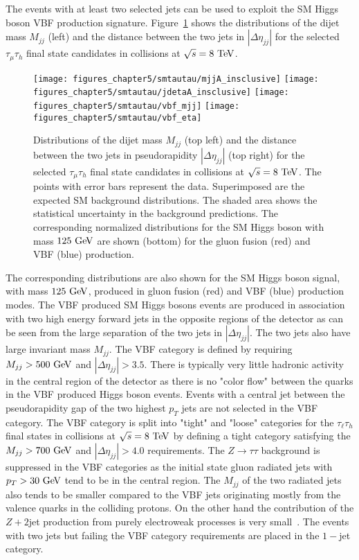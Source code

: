 The events with at least two selected jets can be used to exploit the SM Higgs boson VBF production signature. Figure~\ref{fig:vbfjet} shows the distributions of the dijet mass $M_{jj}$ (left) and the distance between the two jets in $|\Delta \eta_{jj}|$ for the selected $\tau_{\mu}\tau_{h}$ final state candidates in collisions at $\sqrt{s}=8~\mathrm{Te\kern -0.1em V}$. 
\begin{figure}[htbp]
\centering
\texttt{[image: figures\_chapter5/smtautau/mjjA\_insclusive]}
\texttt{[image: figures\_chapter5/smtautau/jdetaA\_insclusive]}
\texttt{[image: figures\_chapter5/smtautau/vbf\_mjj]}
\texttt{[image: figures\_chapter5/smtautau/vbf\_eta]}
\caption{Distributions of the dijet mass $M_{jj}$ (top left) and the distance between the two jets in pseudorapidity $|\Delta \eta_{jj}|$ (top right) for the selected $\tau_{\mu}\tau_{h}$ final state candidates in collisions at $\sqrt{s}=8~\mathrm{Te\kern -0.1em V}$. The points with error bars represent the data. Superimposed are the expected SM background distributions. The shaded area shows the statistical uncertainty in the background predictions. The corresponding normalized distributions for the SM Higgs boson with mass $125~\mathrm{Ge\kern -0.1em V}$ are shown (bottom) for the gluon fusion (red) and VBF (blue) production.}
\label{fig:vbfjet}
\end{figure}
The corresponding distributions are also shown for the SM Higgs boson signal, with mass $125~\mathrm{Ge\kern -0.1em V}$, produced in gluon fusion (red) and VBF (blue) production modes. The VBF produced SM Higgs bosons events are produced in association with two high energy forward jets in the opposite regions of the detector as can be seen from the large separation of the two jets in $|\Delta \eta_{jj}|$. The two jets also have large invariant mass $M_{jj}$.  The VBF category is defined by requiring $M_{jj}>500~\mathrm{Ge\kern -0.1em V}$ and  $|\Delta \eta_{jj}|>3.5$. There is typically very little hadronic activity in the central region of the detector as there is no "color flow" between the quarks in the VBF produced Higgs boson events. Events with a central jet between the pseudorapidity gap of the two highest $p_{T}$ jets are not selected in the VBF category. The VBF category is split into "tight" and "loose" categories for the $\tau_{\ell}\tau_{h}$ final states in collisions at $\sqrt{s}=8~\mathrm{Te\kern -0.1em V}$ by defining a tight category satisfying the $M_{jj}>700~\mathrm{Ge\kern -0.1em V}$ and $|\Delta \eta_{jj}|>4.0$ requirements. The $Z\rightarrow\tau\tau$ background is suppressed in the VBF categories as the initial state gluon radiated jets with $p_{T}>30~\mathrm{Ge\kern -0.1em V}$ tend to be in the central region. The $M_{jj}$ of the two radiated jets also tends to be smaller compared to the VBF jets originating mostly from the valence quarks in the colliding protons. On the other hand the contribution of the $Z+2$jet production from purely electroweak processes is very small~\cite{Khachatryan:2014dea}. The events with two jets but failing the VBF category requirements are placed in the $1-$jet category. 

